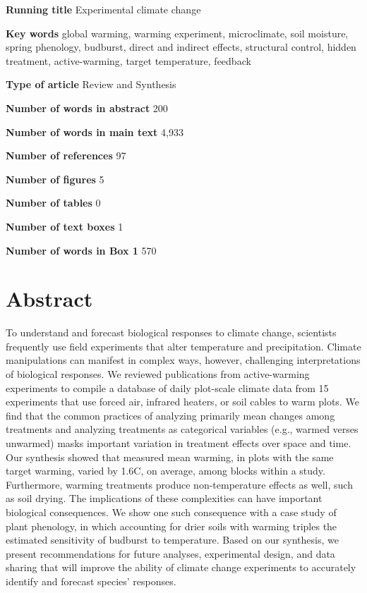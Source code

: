 \documentclass{article}
\begin{document}
\textbf{Running title} Experimental climate change

\textbf{Key words} global warming, warming experiment, microclimate, soil moisture, spring phenology, budburst, direct and indirect effects, structural control, hidden treatment, active-warming, target temperature, feedback

\textbf{Type of article} Review and Synthesis

\textbf{Number of words in abstract} 200

\textbf{Number of words in main text} 4,933%

\textbf{Number of references} 97

\textbf{Number of figures} 5

\textbf{Number of tables} 0

\textbf{Number of text boxes} 1

\textbf{Number of words in Box 1} 570

\clearpage

\clearpage
\linenumbers



\section*{Abstract}
\par To understand and forecast biological responses to climate change, scientists frequently use field experiments that alter temperature and precipitation. Climate manipulations can manifest in complex ways, however, challenging interpretations of biological responses. We reviewed publications from active-warming experiments to compile a database of daily plot-scale climate data from 15 experiments that use forced air, infrared heaters, or soil cables to warm plots. We find that the common practices of analyzing primarily mean changes among treatments and analyzing treatments as categorical variables (e.g., warmed verses unwarmed) masks important variation in treatment effects over space and time. Our synthesis showed that measured mean warming, in plots with the same target warming, varied by 1.6\degree C, on average, among blocks within a study. Furthermore, warming treatments produce non-temperature effects as well, such as soil drying. The implications of these complexities can have important biological consequences. We show one such consequence with a case study of plant phenology, in which accounting for drier soils with warming triples the estimated sensitivity of budburst to temperature. Based on our synthesis, we present recommendations for future analyses, experimental design, and data sharing that will improve the ability of climate change experiments to accurately identify and forecast species' responses.
\end{document}
